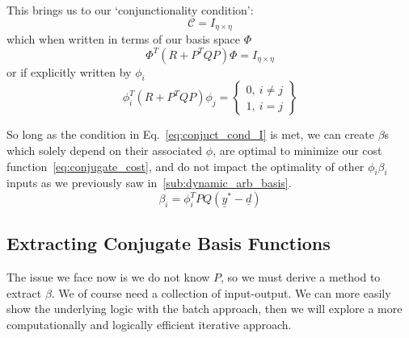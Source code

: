This brings us to our `conjunctionality condition':
\begin{equation}
    \mathcal{C} = I_{\eta \times \eta}
\end{equation}
which when written in terms of our basis space $\Phi$
\begin{equation}
    \Phi^T \left(R + P^T QP\right) \Phi = I_{\eta \times \eta}
    \label{eq:conjuct_cond_I}
\end{equation}
or if explicitly written by $\phi_i$
\begin{equation}
    \phi_i^T \left(R + P^T QP\right) \phi_j =
    \begin{Bmatrix}
        0,\ i \neq j \\
        1,\ i = j
    \end{Bmatrix}
\end{equation}

So long as the condition in Eq.~\ref{eq:conjuct_cond_I} is met, we can create $\beta$s which solely depend on their associated $\phi$, are optimal to minimize our cost function~\ref{eq:conjugate_cost}, and do not impact the optimality of other $\phi_i \beta_i$ inputs as we previously saw in~\ref{sub:dynamic_arb_basis}.
\begin{equation}
    \beta_i = \phi_i^T P Q (\underline{y}^\ast - \underline{d})
    \label{eq:optimal_beta_lql}
\end{equation}

\FloatBarrier\subsection{Extracting Conjugate Basis Functions}
The issue we face now is we do not know $P$, so we must derive a method to extract $\beta$. We of course need a collection of input-output. We can more easily show the underlying logic with the batch approach, then we will explore a more computationally and logically efficient iterative approach.

